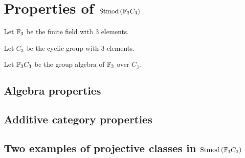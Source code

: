 \section{Properties of \texorpdfstring{\( \operatorname{Stmod}\left(  {\mathbb{F}}_3 C_3  \right) \)}{Stmod(F\_3C\_3)}} 

\begin{notation}
    Let \( {\mathbb{F}}_3 \) be the finite field with \( 3 \) elements.
\end{notation}

\begin{notation}
    Let \( C_3 \) be the cyclic group with \( 3 \) elements.
\end{notation}

\begin{notation}
    Let \( {\mathbb{F}}_3 C_3 \) be the group algebra of \( {\mathbb{F}}_3 \) over \( C_3 \).
\end{notation}

\subsection{Algebra properties}



\subsection{Additive category properties}



\subsection{Two examples of projective classes in \texorpdfstring{\( \operatorname{Stmod}\left(  {\mathbb{F}}_3 C_3  \right) \)}{Stmod(F\_3C\_3)}}

